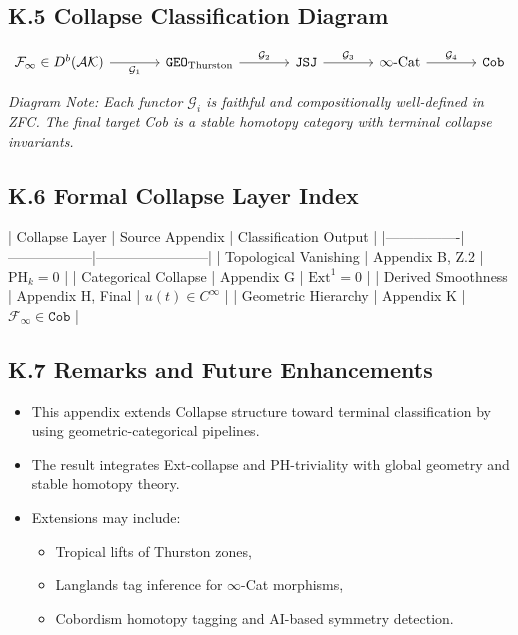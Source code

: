 \documentclass[11pt]{article}
\begin{document}
\begin{axiom}
\begin{axiom}
\subsection*{K.5 Collapse Classification Diagram}

\[
\begin{tikzcd}[column sep=large, row sep=large]
\mathcal{F}_\infty \in D^b(\mathcal{AK}) \arrow[r, "\mathcal{G}_1", swap] & 
\texttt{GEO}_{\text{Thurston}} \arrow[r, "\mathcal{G}_2"] & 
\texttt{JSJ} \arrow[r, "\mathcal{G}_3"] & 
\infty\text{-Cat} \arrow[r, "\mathcal{G}_4"] & 
\texttt{Cob}
\end{tikzcd}
\]

\textit{Diagram Note: Each functor \( \mathcal{G}_i \) is faithful and compositionally well-defined in ZFC.  
The final target Cob is a stable homotopy category with terminal collapse invariants.}

\subsection*{K.6 Formal Collapse Layer Index}

| Collapse Layer | Source Appendix | Classification Output |
|----------------|------------------|------------------------|
| Topological Vanishing | Appendix B, Z.2 | \( \mathrm{PH}_k = 0 \) |
| Categorical Collapse | Appendix G | \( \mathrm{Ext}^1 = 0 \) |
| Derived Smoothness | Appendix H, Final | \( u(t) \in C^\infty \) |
| Geometric Hierarchy | Appendix K | \( \mathcal{F}_\infty \in \texttt{Cob} \) |

\subsection*{K.7 Remarks and Future Enhancements}

\begin{itemize}
  \item This appendix extends Collapse structure toward terminal classification by using geometric-categorical pipelines.
  \item The result integrates Ext-collapse and PH-triviality with global geometry and stable homotopy theory.
  \item Extensions may include:
  \begin{itemize}
    \item Tropical lifts of Thurston zones,
    \item Langlands tag inference for \( \infty \)-Cat morphisms,
    \item Cobordism homotopy tagging and AI-based symmetry detection.
  \end{itemize}
\end{itemize}


\end{axiom}
\end{axiom}
\end{document}
